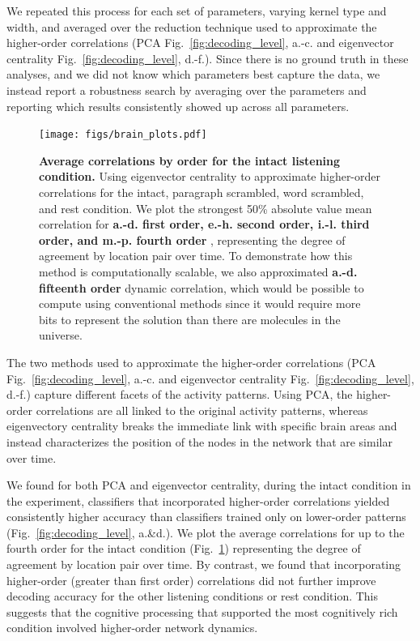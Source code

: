 \documentclass[english]{article}
\begin{document}
We repeated this process for each set of parameters, varying kernel
type and width, and averaged over the reduction technique used to
approximate the higher-order correlations (PCA Fig.~\ref{fig:decoding_level},  a.-c. and eigenvector
centrality Fig.~\ref{fig:decoding_level},  d.-f.).  Since there is no ground truth in these analyses, and we did not know
which parameters best capture the data, we instead report a robustness
search by averaging over the parameters and reporting which results
consistently showed up across all parameters.
\begin{figure}
  \centering
  \texttt{[image: figs/brain\_plots.pdf]}
  \caption{\textbf{Average correlations by order for the intact listening condition.} Using eigenvector
    centrality to approximate higher-order correlations for the
    intact, paragraph scrambled, word scrambled, and rest condition.
    We plot the
    strongest 50\% absolute value
    mean correlation for \textbf{a.-d. first order, e.-h. second order,
      i.-l. third order, and m.-p. fourth order }, representing the degree of agreement by
    location pair over time.  To demonstrate how this method is
    computationally scalable, we also approximated
    \textbf{a.-d. fifteenth order} dynamic correlation, which would be
    possible to compute using conventional methods since it would require more bits to represent the solution than there are molecules in the universe.}
  \label{fig:brain_plots}
\end{figure}

The two methods used to approximate the higher-order correlations (PCA Fig.~\ref{fig:decoding_level},  a.-c. and eigenvector
centrality Fig.~\ref{fig:decoding_level},  d.-f.) capture different
facets of the activity patterns.  Using PCA, the higher-order
correlations are all linked to the original activity patterns, whereas
eigenvectory centrality breaks the immediate link with specific brain
areas and instead characterizes the position of the nodes in the
network that are similar over time.

We found for both PCA and eigenvector centrality, during the intact
condition in the experiment, classifiers that incorporated
higher-order correlations yielded consistently higher accuracy than
classifiers trained only on lower-order patterns
(Fig.~\ref{fig:decoding_level}, a.\&d.).  We plot the average
correlations for up to the fourth order for the intact condition
(Fig.~\ref{fig:brain_plots}) representing the degree of agreement by
location pair over time.  By contrast, we found that incorporating
higher-order (greater than first order) correlations did not further
improve decoding accuracy for the other listening conditions or rest
condition.  This suggests that the cognitive processing that supported
the most cognitively rich condition involved higher-order network
dynamics.
\end{document}
